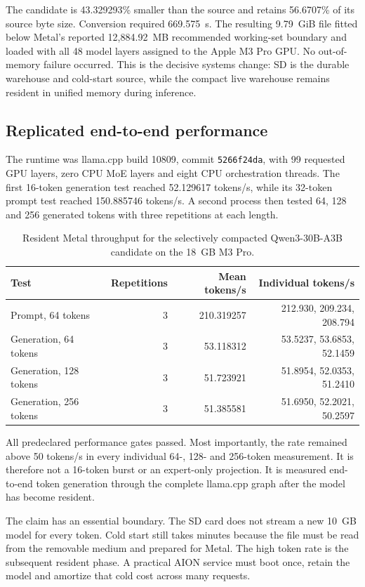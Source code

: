 The candidate is 43.329293\% smaller than the source and retains 56.6707\% of
its source byte size.  Conversion required 669.575~s.  The resulting 9.79~GiB
file fitted below Metal's reported 12{,}884.92~MB recommended working-set
boundary and loaded with all 48 model layers assigned to the Apple M3 Pro GPU.
No out-of-memory failure occurred.  This is the decisive systems change: SD is
the durable warehouse and cold-start source, while the compact live warehouse
remains resident in unified memory during inference.

\subsection{Replicated end-to-end performance}

The runtime was llama.cpp build 10809, commit \texttt{5266f24da}, with 99
requested GPU layers, zero CPU MoE layers and eight CPU orchestration threads.
The first 16-token generation test reached 52.129617 tokens/s, while its
32-token prompt test reached 150.885746 tokens/s.  A second process then tested
64, 128 and 256 generated tokens with three repetitions at each length.

\begin{table}[ht]
\centering
\begin{tabular}{lrrr}
\toprule
Test & Repetitions & Mean tokens/s & Individual tokens/s \\
\midrule
Prompt, 64 tokens & 3 & 210.319257 & 212.930, 209.234, 208.794 \\
Generation, 64 tokens & 3 & 53.118312 & 53.5237, 53.6853, 52.1459 \\
Generation, 128 tokens & 3 & 51.723921 & 51.8954, 52.0353, 51.2410 \\
Generation, 256 tokens & 3 & 51.385581 & 51.6950, 52.2021, 50.2597 \\
\bottomrule
\end{tabular}
\caption{Resident Metal throughput for the selectively compacted
Qwen3-30B-A3B candidate on the 18~GB M3 Pro.}
\end{table}

All predeclared performance gates passed.  Most importantly, the rate remained
above 50 tokens/s in every individual 64-, 128- and 256-token measurement.  It
is therefore not a 16-token burst or an expert-only projection.  It is measured
end-to-end token generation through the complete llama.cpp graph after the model
has become resident.

The claim has an essential boundary.  The SD card does not stream a new 10~GB
model for every token.  Cold start still takes minutes because the file must be
read from the removable medium and prepared for Metal.  The high token rate is
the subsequent resident phase.  A practical AION service must boot once, retain
the model and amortize that cold cost across many requests.

